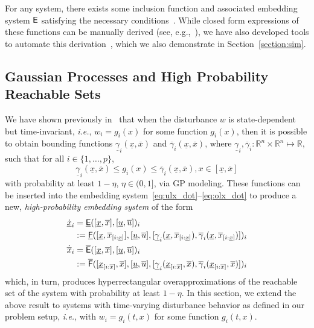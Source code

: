 \documentclass{IEEEojcsys}
\newcommand{\ul}{\underline}
\newcommand{\ol}{\overline}
\begin{document}
For any system, there exists some inclusion function and associated embedding system $\mathsf{E}$ satisfying the necessary conditions~\cite{abateTight}. While closed form expressions of these functions can be manually derived (see, e.g.,~\cite{caoMMGPsMPC, abateSpaceCraft}), we have also developed tools to automate this derivation~\cite{immrax}, which we also demonstrate in Section~\ref{section:sim}.


\subsection{Gaussian Processes and High Probability Reachable Sets}
\label{section:gp}
We have shown previously in~\cite{caoMMGPOJCSYS} that when the disturbance $w$ is state-dependent but time-invariant, \emph{i.e.}, $w_i = g_i(x)$ for some function $g_i(x)$, then it is possible to obtain bounding functions $\ul{\gamma}_i(\ul{x}, \ol{x})$ and $\ol{\gamma}_i(\ul{x}, \ol{x})$, where $\ul{\gamma}_i, \ol{\gamma}_i: \mathbb{R}^n\times\mathbb{R}^n\mapsto\mathbb{R}$, such that for all $i\in\{1,\ldots,p\}$,
\begin{equation}
\label{eq:timeinv_GPbound}
    \ul{\gamma}_i(\ul{x},\ol{x}) \leq g_i(x) \leq \ol{\gamma}_i(\ul{x}, \ol{x}), x \in [\ul{x}, \ol{x}]
\end{equation}
with probability at least $1-\eta$, $\eta \in (0, 1]$, via \ac{GP} modeling. These functions can be inserted into the embedding system~\eqref{eq:ulx_dot}--\eqref{eq:olx_dot} to produce a new, \emph{high-probability embedding system} of the form
\begin{align}
    \dot{\ul{x}}_i&= \ul{\sfE}([\ul{x}, \ol{x}], [\ul{u}, \ol{u}])_i \label{eq:ulx_gamma_Tinv}\\
    &:= \ul{\sfF}([\ul{x}, \ol{x}_{[i:\ul{x}]}], [\ul{u}, \ol{u}], [\ul{\gamma}_i(\ul{x}, \ol{x}_{[i:\ul{x}]}), \ol{\gamma}_i(\ul{x}, \ol{x}_{[i:\ul{x}]})])_i\nonumber\\
    \dot{\ol{x}}_i&= \ol{\sfE}([\ul{x}, \ol{x}], [\ul{u}, \ol{u}])_i \label{eq:olx_gamma_Tinv}\\
    &:= \ol{\sfF}([\ul{x}_{[i:\ol{x}]}, \ol{x}], [\ul{u}, \ol{u}], [\ul{\gamma}_i(\ul{x}_{[i:\ol{x}]}, \ol{x}), \ol{\gamma}_i(\ul{x}_{[i:\ol{x}]}, \ol{x})])_i\nonumber
\end{align}
which, in turn, produces hyperrectangular overapproximations of the reachable set of the system with probability at least $1-\eta$.
In this section, we extend the above result to systems with time-varying disturbance behavior as defined in our problem setup, \emph{i.e.}, with $w_i = g_i(t, x)$ for some function $g_i(t, x)$.
\end{document}
